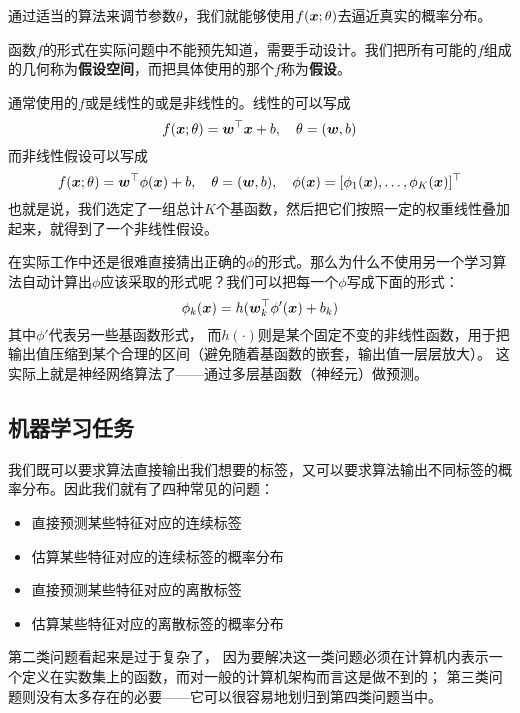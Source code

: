 \documentclass[UTF8, a4paper]{ctexart}
\begin{document}
通过适当的算法来调节参数$\theta$，我们就能够使用$f(\vb*{x};\theta)$去逼近真实的概率分布。

函数$f$的形式在实际问题中不能预先知道，需要手动设计。我们把所有可能的$f$组成的几何称为\textbf{假设空间}，而把具体使用的那个$f$称为\textbf{假设}。

通常使用的$f$或是线性的或是非线性的。线性的可以写成
\begin{equation}
    f(\vb*{x};\theta) = \vb*{w}^\top \vb*{x} + b, \quad \theta = (\vb*{w}, b)
\end{equation}
而非线性假设可以写成
\begin{equation}
    f(\vb*{x};\theta) = \vb*{w}^\top \phi (\vb*{x}) + b, \quad \theta = (\vb*{w}, b), \quad \phi(\vb*{x}) = [\phi_1(\vb*{x}), \ldots, \phi_K(\vb*{x})]^\top
\end{equation}
也就是说，我们选定了一组总计$K$个基函数，然后把它们按照一定的权重线性叠加起来，就得到了一个非线性假设。

在实际工作中还是很难直接猜出正确的$\phi$的形式。那么为什么不使用另一个学习算法自动计算出$\phi$应该采取的形式呢？我们可以把每一个$\phi$写成下面的形式：
\begin{equation}
    \phi_k (\vb*{x}) = h (\vb*{w}_k^\top \phi'(\vb*{x})+b_k)
    \label{eq:recursive-nonlinear}
\end{equation}
其中$\phi'$代表另一些基函数形式，
而$h(\cdot)$则是某个固定不变的非线性函数，用于把输出值压缩到某个合理的区间（避免随着基函数的嵌套，输出值一层层放大）。
这实际上就是神经网络算法了——通过多层基函数（神经元）做预测。

\subsection{机器学习任务}

我们既可以要求算法直接输出我们想要的标签，又可以要求算法输出不同标签的概率分布。因此我们就有了四种常见的问题：
\begin{itemize}
    \item 直接预测某些特征对应的连续标签
    \item 估算某些特征对应的连续标签的概率分布
    \item 直接预测某些特征对应的离散标签 
    \item 估算某些特征对应的离散标签的概率分布
\end{itemize}

第二类问题看起来是过于复杂了，
因为要解决这一类问题必须在计算机内表示一个定义在实数集上的函数，而对一般的计算机架构而言这是做不到的；
第三类问题则没有太多存在的必要——它可以很容易地划归到第四类问题当中。
\end{document}
